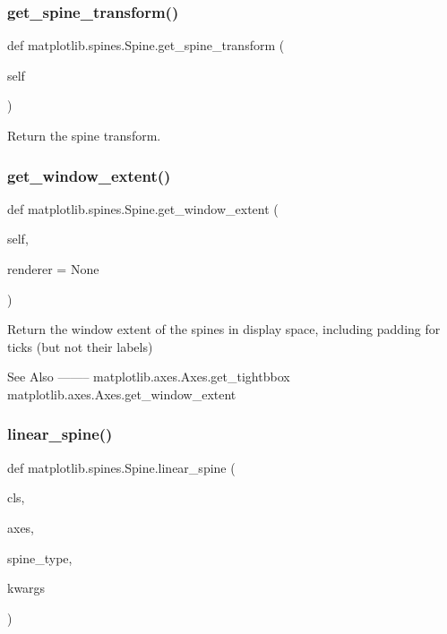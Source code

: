 \subsubsection{\texorpdfstring{get\+\_\+spine\+\_\+transform()}{get\_spine\_transform()}}
{\footnotesize\ttfamily def matplotlib.\+spines.\+Spine.\+get\+\_\+spine\+\_\+transform (\begin{DoxyParamCaption}\item[{}]{self }\end{DoxyParamCaption})}

\begin{DoxyVerb}Return the spine transform.\end{DoxyVerb}
 \mbox{\label{classmatplotlib_1_1spines_1_1Spine_ab2675de545d18f94b65987723d19e0ac}} 
\subsubsection{\texorpdfstring{get\+\_\+window\+\_\+extent()}{get\_window\_extent()}}
{\footnotesize\ttfamily def matplotlib.\+spines.\+Spine.\+get\+\_\+window\+\_\+extent (\begin{DoxyParamCaption}\item[{}]{self,  }\item[{}]{renderer = {\ttfamily None} }\end{DoxyParamCaption})}

\begin{DoxyVerb}Return the window extent of the spines in display space, including
padding for ticks (but not their labels)

See Also
--------
matplotlib.axes.Axes.get_tightbbox
matplotlib.axes.Axes.get_window_extent
\end{DoxyVerb}
 \mbox{\label{classmatplotlib_1_1spines_1_1Spine_ab3eb1068c4f8d867665792a470eb8957}} 
\subsubsection{\texorpdfstring{linear\+\_\+spine()}{linear\_spine()}}
{\footnotesize\ttfamily def matplotlib.\+spines.\+Spine.\+linear\+\_\+spine (\begin{DoxyParamCaption}\item[{}]{cls,  }\item[{}]{axes,  }\item[{}]{spine\+\_\+type,  }\item[{}]{kwargs }\end{DoxyParamCaption})}

